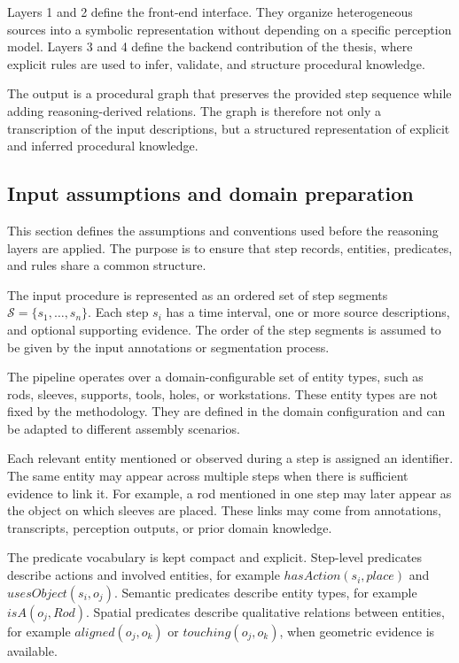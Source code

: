 Layers 1 and 2 define the front-end interface. They organize heterogeneous sources into a symbolic representation without depending on a specific perception model. Layers 3 and 4 define the backend contribution of the thesis, where explicit rules are used to infer, validate, and structure procedural knowledge.

The output is a procedural graph that preserves the provided step sequence while adding reasoning-derived relations. The graph is therefore not only a transcription of the input descriptions, but a structured representation of explicit and inferred procedural knowledge.


\subsection{Input assumptions and domain preparation}
\label{sec:input-assumptions}

This section defines the assumptions and conventions used before the reasoning layers are applied. The purpose is to ensure that step records, entities, predicates, and rules share a common structure.

The input procedure is represented as an ordered set of step segments $\mathcal{S} = \{s_1,\ldots,s_n\}$. Each step $s_i$ has a time interval, one or more source descriptions, and optional supporting evidence. The order of the step segments is assumed to be given by the input annotations or segmentation process.

The pipeline operates over a domain-configurable set of entity types, such as rods, sleeves, supports, tools, holes, or workstations. These entity types are not fixed by the methodology. They are defined in the domain configuration and can be adapted to different assembly scenarios.

Each relevant entity mentioned or observed during a step is assigned an identifier. The same entity may appear across multiple steps when there is sufficient evidence to link it. For example, a rod mentioned in one step may later appear as the object on which sleeves are placed. These links may come from annotations, transcripts, perception outputs, or prior domain knowledge.

The predicate vocabulary is kept compact and explicit. Step-level predicates describe actions and involved entities, for example $hasAction(s_i,place)$ and $usesObject(s_i,o_j)$. Semantic predicates describe entity types, for example $isA(o_j,Rod)$. Spatial predicates describe qualitative relations between entities, for example $aligned(o_j,o_k)$ or $touching(o_j,o_k)$, when geometric evidence is available.


